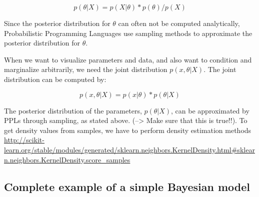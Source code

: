 \documentclass{article}
\begin{document}
\begin{equation}
p(\theta|X) = p(X|\theta) * p(\theta) / p(X)
\end{equation}

Since the posterior distribution for $\theta$ can often not be computed analytically, Probabilistic Programming Languages use sampling methods to approximate the posterior distribution for $\theta$.

When we want to visualize parameters and data, and also want to condition and marginalize arbitrarily, we need the joint distribution $p(x,\theta|X)$. The joint distribution can be computed by:

\begin{equation}
p(x,\theta|X) = p(x|\theta) * p(\theta|X)
\end{equation}

The posterior distribution of the parameters, $p(\theta|X)$, can be approximated by PPLs through sampling, as stated above. (--> Make sure that this is true!!). To get density values from samples, we have to perform density estimation methods \url{http://scikit-learn.org/stable/modules/generated/sklearn.neighbors.KernelDensity.html#sklearn.neighbors.KernelDensity.score_samples}

\subsection{Complete example of a simple Bayesian model}
\label{subsec: Complete example of a simple Bayesian model}
\end{document}
